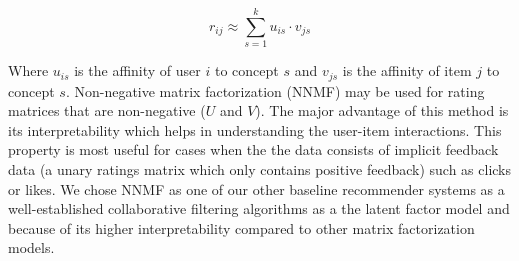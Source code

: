            \begin{equation}
               r_{ij} \approx \sum_{s=1}^{k} u_{is} \cdot v_{js}
           \end{equation}
           \vspace{0.25cm}
       
            Where $u_{is}$ is the affinity of user $i$ to concept $s$ and $v_{js}$ is the affinity of item $j$ to concept $s$. Non-negative matrix factorization (NNMF) \cite{lee2001algorithms,zhang2006learning} may be used for rating matrices that are non-negative ($U$ and $V$). The major advantage of this method is its interpretability which helps in understanding the user-item interactions. This property is most useful for cases when the the data consists of implicit feedback data (a unary ratings matrix which only contains positive feedback) such as clicks or likes. We chose NNMF as one of our other baseline recommender systems as a well-established collaborative filtering algorithms as a the latent factor model and because of its higher interpretability compared to other matrix factorization models.
       
       

        
        
        
